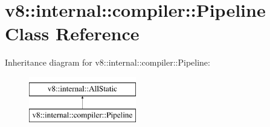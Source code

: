 \hypertarget{classv8_1_1internal_1_1compiler_1_1Pipeline}{}\section{v8\+:\+:internal\+:\+:compiler\+:\+:Pipeline Class Reference}
\label{classv8_1_1internal_1_1compiler_1_1Pipeline}
Inheritance diagram for v8\+:\+:internal\+:\+:compiler\+:\+:Pipeline\+:\begin{figure}[H]
\begin{center}
\leavevmode
\includegraphics[height=2.000000cm]{classv8_1_1internal_1_1compiler_1_1Pipeline}
\end{center}
\end{figure}
